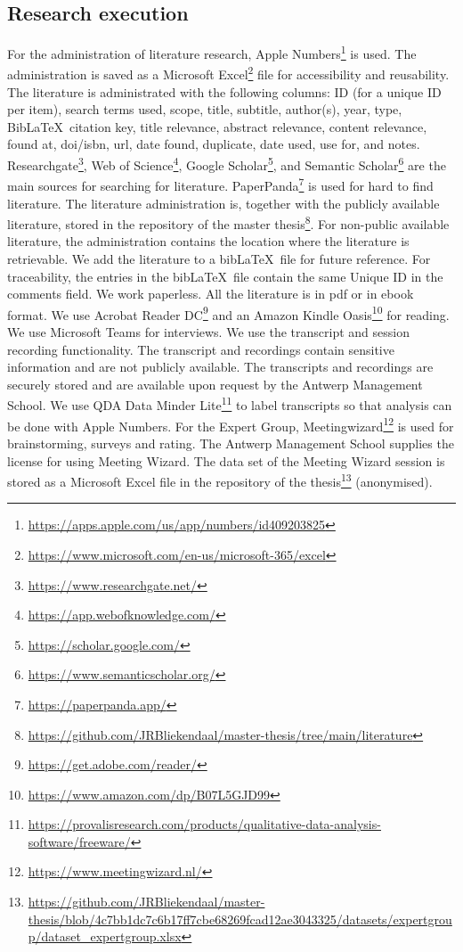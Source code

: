 \subsection{Research execution}
\label{subsub:tbresearchexecution}
For the administration of literature research, Apple Numbers\footnote{\url{https://apps.apple.com/us/app/numbers/id409203825}} is used. The administration is saved as a Microsoft Excel\footnote{\url{https://www.microsoft.com/en-us/microsoft-365/excel}} file for accessibility and reusability. The literature is administrated with the following columns: ID (for a unique ID per item), search terms used, scope, title, subtitle, author(s), year, type, Bib\LaTeX\ citation key, title relevance, abstract relevance, content relevance, found at, doi/isbn, url, date found, duplicate, date used, use for, and notes. Researchgate\footnote{\url{https://www.researchgate.net/}}, Web of Science\footnote{\url{https://app.webofknowledge.com/}}, Google Scholar\footnote{\url{https://scholar.google.com/}}, and Semantic Scholar\footnote{\url{https://www.semanticscholar.org/}} are the main sources for searching for literature. PaperPanda\footnote{\url{https://paperpanda.app/}} is used for hard to find literature. The literature administration is, together with the publicly available literature, stored in the repository of the master thesis\footnote{\url{https://github.com/JRBliekendaal/master-thesis/tree/main/literature}}. For non-public available literature, the administration contains the location where the literature is retrievable. We add the literature to a bib\LaTeX\ file for future reference. For traceability, the entries in the bib\LaTeX\ file contain the same Unique ID in the comments field. We work paperless. All the literature is in pdf or in ebook format. We use Acrobat Reader DC\footnote{\url{https://get.adobe.com/reader/}} and an Amazon Kindle Oasis\footnote{\url{https://www.amazon.com/dp/B07L5GJD99}} for reading. We use Microsoft Teams for interviews. We use the transcript and session recording functionality. The transcript and recordings contain sensitive information and are not publicly available. The transcripts and recordings are securely stored and are available upon request by the Antwerp Management School. We use QDA Data Minder Lite\footnote{\url{https://provalisresearch.com/products/qualitative-data-analysis-software/freeware/}} to label transcripts so that analysis can be done with Apple Numbers. For the Expert Group, Meetingwizard\footnote{\url{https://www.meetingwizard.nl/}} is used for brainstorming, surveys and rating. The Antwerp Management School supplies the license for using Meeting Wizard. The data set of the Meeting Wizard session is stored as a Microsoft Excel file in the repository of the thesis\footnote{\url{https://github.com/JRBliekendaal/master-thesis/blob/4c7bb1dc7c6b17ff7cbe68269fcad12ae3043325/datasets/expertgroup/dataset_expertgroup.xlsx}} (anonymised).
